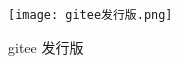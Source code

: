 \begin{figure}[htbp]
  \centering
  \texttt{[image: gitee发行版.png]}
  \caption{gitee 发行版}
  \label{figure:gitee发行版}
\end{figure}





